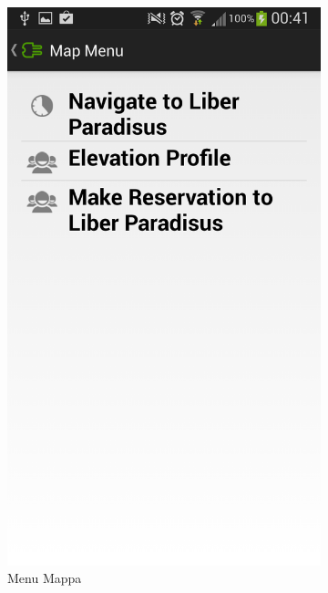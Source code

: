 \begin{figure}
	\centering
	\begin{subfigure}{0.45\textwidth}
		\includegraphics[width=\textwidth]{assets/mobile-app-map-menu.png}
		\caption{Menu Mappa}
		\label{fig:map-menu}
	\end{subfigure}
	\begin{subfigure}{0.45\textwidth}

\end{subfigure}
\end{figure}
